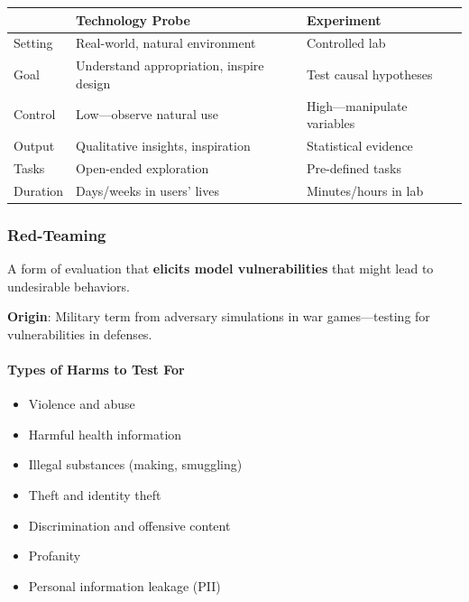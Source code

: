 \begin{center}
\renewcommand{\arraystretch}{1.3}
\begin{tabular}{@{} l p{5cm} p{5cm} @{}}
\toprule
& \textbf{Technology Probe} & \textbf{Experiment} \\
\midrule
Setting & Real-world, natural environment & Controlled lab \\
Goal & Understand appropriation, inspire design & Test causal hypotheses \\
Control & Low---observe natural use & High---manipulate variables \\
Output & Qualitative insights, inspiration & Statistical evidence \\
Tasks & Open-ended exploration & Pre-defined tasks \\
Duration & Days/weeks in users' lives & Minutes/hours in lab \\
\bottomrule
\end{tabular}
\end{center}

\subsubsection*{Red-Teaming}

\begin{defbox}
A form of evaluation that \textbf{elicits model vulnerabilities} that might lead to undesirable behaviors.

\textbf{Origin}: Military term from adversary simulations in war games---testing for vulnerabilities in defenses.
\end{defbox}

\paragraph*{Types of Harms to Test For}
\begin{itemize}
  \item Violence and abuse
  \item Harmful health information
  \item Illegal substances (making, smuggling)
  \item Theft and identity theft
  \item Discrimination and offensive content
  \item Profanity
  \item Personal information leakage (PII)
\end{itemize}

